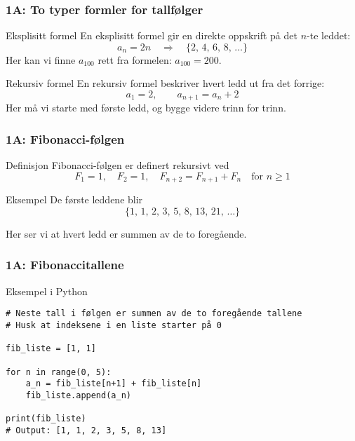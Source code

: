 \blueheader
\begin{frame}
\frametitle{1A: To typer formler for tallfølger}
\begin{red*}{Eksplisitt formel}
En eksplisitt formel gir en direkte oppskrift på det $n$-te leddet:
\[
a_n = 2n \quad \Rightarrow \quad \{2,\,4,\,6,\,8,\,\ldots\}
\]
Her kan vi finne $a_{100}$ rett fra formelen: $a_{100}=200$.
\end{red*}

\begin{red*}{Rekursiv formel}
En rekursiv formel beskriver hvert ledd ut fra det forrige:
\[
a_1 = 2, \qquad a_{n+1} = a_n + 2
\]
Her må vi starte med første ledd, og bygge videre trinn for trinn.
\end{red*}
\end{frame}

\blueheader
\begin{frame}
\frametitle{1A: Fibonacci-følgen}

\begin{blue*}{Definisjon}
Fibonacci-følgen er definert rekursivt ved
\begin{equation*}
F_1 = 1, \quad F_2 = 1, \quad F_{n+2} = F_{n+1} + F_n \quad \text{for } n \geq 1
\end{equation*}
\end{blue*}

\begin{green*}{Eksempel}
De første leddene blir
\begin{equation*}
\{1,\,1,\,2,\,3,\,5,\,8,\,13,\,21,\,\ldots\}
\end{equation*}

Her ser vi at hvert ledd er summen av de to foregående.
\end{green*}

\end{frame}

\blueheader
\begin{frame}[fragile]
\frametitle{1A: Fibonaccitallene}

\begin{green*}{Eksempel i Python}
\begin{verbatim}
# Neste tall i følgen er summen av de to foregående tallene
# Husk at indeksene i en liste starter på 0

fib_liste = [1, 1]

for n in range(0, 5):
    a_n = fib_liste[n+1] + fib_liste[n]
    fib_liste.append(a_n)

print(fib_liste)
# Output: [1, 1, 2, 3, 5, 8, 13]
\end{verbatim}
\end{green*}
\end{frame}


